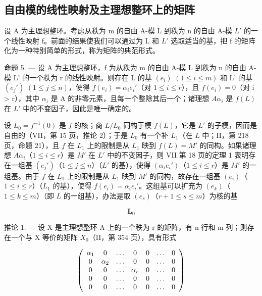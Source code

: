 \subsection{自由模的线性映射及主理想整环上的矩阵}

设 A 为主理想整环。考虑从秩为 m 的自由 A-模 L 到秩为 n 的自由 A-模 \(L'\) 的一个线性映射 f。前面的结果使我们可以通过为 L 和 \(L'\) 选取适当的基，把 f 的矩阵化为一种特别简单的形式，称为矩阵的典范形式。

命题 5. --- 设 A 为主理想整环，f 为从秩为 m 的自由 A-模 L 到秩为 n 的自由 A-模 L' 的一个秩为 r 的线性映射。则存在 L 的基 \((e_{i})\) \((1 \leqslant i \leqslant m)\) 和 L' 的基 \((e_{j}')\) \((1 \leqslant j \leqslant n)\)，使得 \(f(e_{i}) = \alpha_{i} e_{i}'\)（对 \(1 \leqslant i \leqslant r\)），且 \(f(e_{i}) = 0\)（对 i \textgreater{} r），其中 \(\alpha_{i}\) 是 A 的非零元素，且每一个整除其后一个；诸理想 \(A\alpha_{i}\) 是 \(f(L)\) 在 \(L'\) 中的不变因子，因此是唯一确定的。

设 \(L_0 = f^{-1}(0)\) 是 \(f\) 的核；商 \(L/L_0\) 同构于模 \(f(L)\)，它是 \(L'\) 的子模，因而是自由的（VII，第 15 页，推论 2）；于是 \(L_0\) 有一个补 \(L_1\)（在 \(L\) 中；II，第 218 页，命题 21），且 \(f\) 在 \(L_1\) 上的限制是从 \(L_1\) 映到 \(f(L) = M'\) 的同构。如果诸理想 \(A\alpha_i\)（\(1 \leqslant i \leqslant r\)）是 \(M'\) 在 \(L'\) 中的不变因子，则 VII 第 18 页的定理 1 表明存在一组基 \((e_j')\)（\(1 \leqslant j \leqslant n\)）（\(L'\) 的基），使得 \((\alpha_i e_i')\)（\(1 \leqslant i \leqslant r\)）是 \(M'\) 的一组基。由于 \(f\) 在 \(L_1\) 上的限制是从 \(L_1\) 映到 \(M'\) 的同构，故存在一组基 \((e_i)\)（\(1 \leqslant i \leqslant r\)）（\(L_1\) 的基），使得 \(f(e_i) = \alpha_i e_i'\)。这组基可以扩充为 \((e_k)\)（\(1 \leqslant k \leqslant m\)）（即 \(L\) 的一组基），办法是取 \((e_s)\)（\(r + 1 \leqslant s \leqslant m\)）为核的基

\[
\mathbf {L} _ {0}
\]

推论 1. --- 设 X 是主理想整环 A 上的一个秩为 r 的矩阵，有 n 行和 m 列；则存在一个与 X 等价的矩阵 \(X_{0}\)（II，第 354 页），具有形式

\[
\left( \begin{array}{c c c c c c c} \alpha_ {1} & 0 & \ldots & 0 & 0 & \ldots & 0 \\ 0 & \alpha_ {2} & \ldots & 0 & 0 & \ldots & 0 \\ 0 & 0 & \ldots & \alpha_ {r} & 0 & \ldots & 0 \\ 0 & 0 & \ldots & 0 & 0 & \ldots & 0 \\ 0 & 0 & \ldots & 0 & 0 & \ldots & 0 \end{array} \right)
\]

